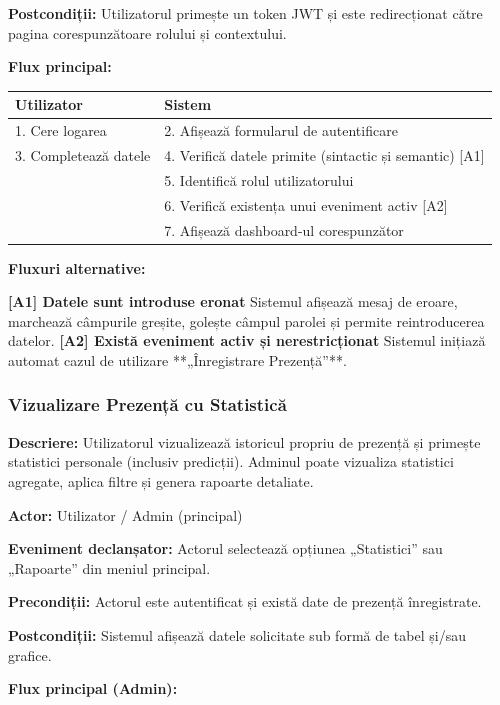 \documentclass[11pt]{article}
\begin{document}
\textbf{Postcondiții:} Utilizatorul primește un token JWT și este redirecționat către pagina corespunzătoare rolului și contextului.

\textbf{Flux principal:}

\begin{tabular}{l l}
\hline
\textbf{Utilizator} & \textbf{Sistem} \\
\hline
1. Cere logarea & 2. Afișează formularul de autentificare \\
3. Completează datele & 4. Verifică datele primite (sintactic și semantic) [A1] \\
 & 5. Identifică rolul utilizatorului \\
 & 6. Verifică existența unui eveniment activ [A2] \\
 & 7. Afișează dashboard-ul corespunzător \\
\hline
\end{tabular}

\textbf{Fluxuri alternative:}

\textbf{[A1] Datele sunt introduse eronat}  
Sistemul afișează mesaj de eroare, marchează câmpurile greșite, golește câmpul parolei și permite reintroducerea datelor.\newline
\textbf{[A2] Există eveniment activ și nerestricționat}
Sistemul inițiază automat cazul de utilizare **„Înregistrare Prezență”**.

\subsubsection{Vizualizare Prezență cu Statistică}


\textbf{Descriere:} Utilizatorul vizualizează istoricul propriu de prezență și primește statistici personale (inclusiv predicții). Adminul poate vizualiza statistici agregate, aplica filtre și genera rapoarte detaliate.

\textbf{Actor:} Utilizator / Admin (principal)

\textbf{Eveniment declanșator:} Actorul selectează opțiunea „Statistici” sau „Rapoarte” din meniul principal.

\textbf{Precondiții:} Actorul este autentificat și există date de prezență înregistrate.

\textbf{Postcondiții:} Sistemul afișează datele solicitate sub formă de tabel și/sau grafice.

\textbf{Flux principal (Admin):}
\end{document}
